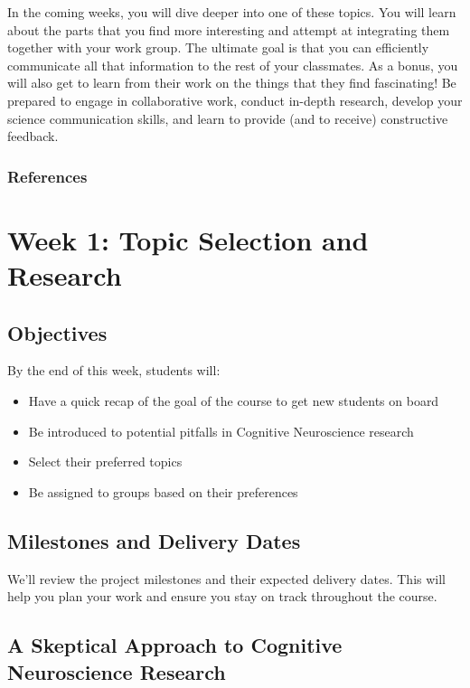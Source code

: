 \documentclass[
  letterpaper,
  DIV=11,
  numbers=noendperiod]{scrreprt}
\providecommand{\tightlist}{%
  \setlength{\itemsep}{0pt}\setlength{\parskip}{0pt}}\usepackage{longtable,booktabs,array}
\begin{document}
In the coming weeks, you will dive deeper into one of these topics. You
will learn about the parts that you find more interesting and attempt at
integrating them together with your work group. The ultimate goal is
that you can efficiently communicate all that information to the rest of
your classmates. As a bonus, you will also get to learn from their work
on the things that they find fascinating! Be prepared to engage in
collaborative work, conduct in-depth research, develop your science
communication skills, and learn to provide (and to receive) constructive
feedback.

\subsection{References}\label{references}

\chapter{Week 1: Topic Selection and
Research}\label{week-1-topic-selection-and-research-1}

\section{Objectives}\label{objectives}

By the end of this week, students will:

\begin{itemize}
\tightlist
\item
  Have a quick recap of the goal of the course to get new students on
  board
\item
  Be introduced to potential pitfalls in Cognitive Neuroscience research
\item
  Select their preferred topics
\item
  Be assigned to groups based on their preferences
\end{itemize}

\section{Milestones and Delivery
Dates}\label{milestones-and-delivery-dates}

We'll review the project milestones and their expected delivery dates.
This will help you plan your work and ensure you stay on track
throughout the course.

\section{A Skeptical Approach to Cognitive Neuroscience
Research}\label{a-skeptical-approach-to-cognitive-neuroscience-research}
\end{document}
